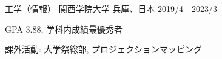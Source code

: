 

\begin{cventries}

  \cventry
    {工学（情報）} %
    {\href{https://www.kwansei.ac.jp/index.html}{関西学院大学}} %
    {兵庫、日本} %
    {2019/4 - 2023/3} %
    {
      \begin{cvitems} %
        \item {GPA 3.88, 学科内成績最優秀者}
        \item {課外活動: 大学祭総部, プロジェクションマッピング}
      \end{cvitems}
    }

\end{cventries}
